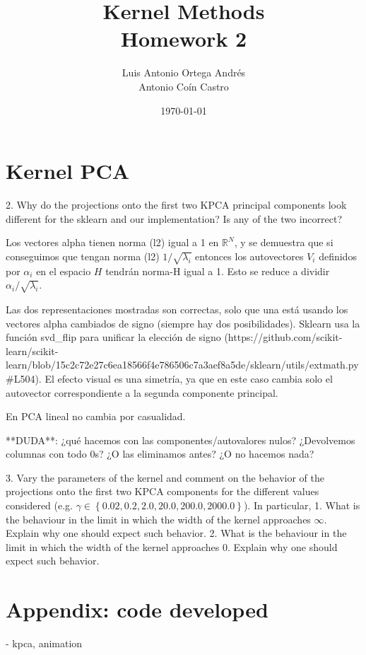 \documentclass[11pt]{article}
\author{Luis Antonio Ortega Andrés\\Antonio Coín Castro}
\date{\today}
\title{Kernel Methods\\\medskip
\large Homework 2}
\begin{document}
\maketitle

\section{Kernel PCA}

2. Why do the projections onto the first two KPCA principal components look different for the sklearn and our implementation? Is any of the two incorrect?

Los vectores alpha tienen norma (l2) igual a 1 en $\mathbb R^N$, y se demuestra que si conseguimos que tengan norma (l2) $1/\sqrt{\lambda_i}$ entonces los autovectores $V_i$ definidos por $\alpha_i$ en el espacio $H$ tendrán norma-H igual a 1. Esto se reduce a dividir $\alpha_i/\sqrt{\lambda_i}$.

Las dos representaciones mostradas son correctas, solo que una está usando los vectores alpha cambiados de signo (siempre hay dos posibilidades). Sklearn usa la función svd_flip para unificar la elección de signo (https://github.com/scikit-learn/scikit-learn/blob/15c2c72e27c6ea18566f4e786506c7a3aef8a5de/sklearn/utils/extmath.py#L504). El efecto visual es una simetría, ya que en este caso cambia solo el autovector correspondiente a la segunda componente principal.

En PCA lineal no cambia por casualidad.

**DUDA**: ¿qué hacemos con las componentes/autovalores nulos? ¿Devolvemos columnas con todo 0s? ¿O las eliminamos antes? ¿O no hacemos nada?

3. Vary the parameters of the kernel and comment on the behavior of the projections onto the first two KPCA components for the different values considered (e.g. $\gamma \in \left\{0.02, 0.2, 2.0, 20.0, 200.0, 2000.0\right\}$). In particular,
    1. What is the behaviour in the limit in which the width of the kernel approaches $\infty$. Explain why one should expect such behavior.
    2. What is the behaviour in the limit in which the width of the kernel approaches $0$. Explain why one should expect such behavior.


\section*{Appendix: code developed}

- kpca, animation
\end{document}

